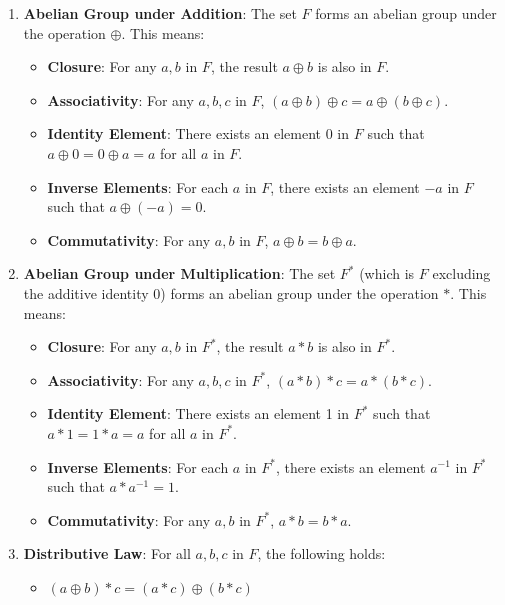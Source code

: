 \documentclass[11pt, letterpaper]{article}
\begin{document}
\begin{enumerate}
    \item \textbf{Abelian Group under Addition}: The set \( F \) forms an abelian group under the operation \( \oplus \). This means:
    \begin{itemize}
        \item \textbf{Closure}: For any \( a, b \) in \( F \), the result \( a \oplus b \) is also in \( F \).
        \item \textbf{Associativity}: For any \( a, b, c \) in \( F \), \( (a \oplus b) \oplus c = a \oplus (b \oplus c) \).
        \item \textbf{Identity Element}: There exists an element 0 in \( F \) such that \( a \oplus 0 = 0 \oplus a = a \) for all \( a \) in \( F \).
        \item \textbf{Inverse Elements}: For each \( a \) in \( F \), there exists an element \(-a \) in \( F \) such that \( a \oplus (-a) = 0 \).
        \item \textbf{Commutativity}: For any \( a, b \) in \( F \), \( a \oplus b = b \oplus a \).
    \end{itemize}
    \item \textbf{Abelian Group under Multiplication}: The set \( F^* \) (which is \( F \) excluding the additive identity 0) forms an abelian group under the operation \( \ast \). This means:
    \begin{itemize}
        \item \textbf{Closure}: For any \( a, b \) in \( F^* \), the result \( a \ast b \) is also in \( F^* \).
        \item \textbf{Associativity}: For any \( a, b, c \) in \( F^* \), \( (a \ast b) \ast c = a \ast (b \ast c) \).
        \item \textbf{Identity Element}: There exists an element 1 in \( F^* \) such that \( a \ast 1 = 1 \ast a = a \) for all \( a \) in \( F^* \).
        \item \textbf{Inverse Elements}: For each \( a \) in \( F^* \), there exists an element \( a^{-1} \) in \( F^* \) such that \( a \ast a^{-1} = 1 \).
        \item \textbf{Commutativity}: For any \( a, b \) in \( F^* \), \( a \ast b = b \ast a \).
    \end{itemize}
    \item \textbf{Distributive Law}: For all \( a, b, c \) in \( F \), the following holds:
    \begin{itemize}
        \item \( (a \oplus b) \ast c = (a \ast c) \oplus (b \ast c) \)
    \end{itemize}
\end{enumerate}
\end{document}
